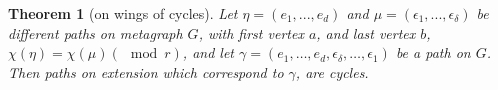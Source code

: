 \documentclass[14pt]{mmcs-article}
\newtheorem{theorem}{Theorem}
\begin{document}
\begin{theorem}[on wings of cycles]\label{theorem_wings}
    Let $\eta = (e_1, ..., e_d)$ and $\mu = (\epsilon_1, ..., \epsilon_{\delta})$ be different paths on metagraph $G$, with first vertex $a$, and last vertex $b$, $\chi(\eta) = \chi(\mu) (\mod{r})$, and let $\gamma = (e_1, \dots, e_d, \epsilon_{\delta}, \dots, \epsilon_1)$ be a path on $G$. Then paths on extension which correspond to $\gamma$, are cycles.
\end{theorem}

\end{document}
